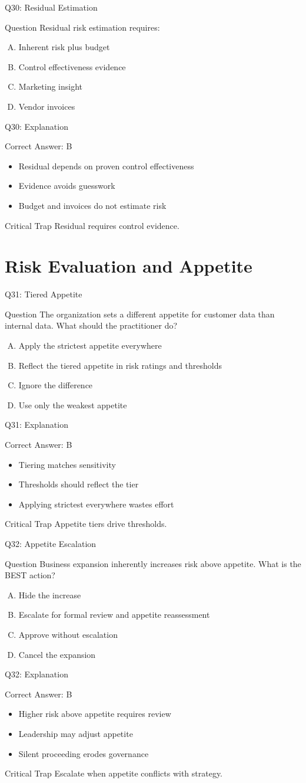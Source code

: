 \documentclass[aspectratio=169]{beamer}
\newcommand{\hq}[7]{%
	\begin{frame}{Q#1: #2}
		\begin{block}{Question}
			#3
		\end{block}
		\begin{enumerate}[(A)]
			#4
		\end{enumerate}
	\end{frame}
	\begin{frame}{Q#1: Explanation}
		\begin{block}{Correct Answer: #5}
			\begin{itemize}
				#6
			\end{itemize}
		\end{block}
		\begin{alertblock}{Critical Trap}
			#7
		\end{alertblock}
	\end{frame}
}
\begin{document}
	\hq{30}{Residual Estimation}
	{Residual risk estimation requires:}
	{\item Inherent risk plus budget
		\item Control effectiveness evidence
		\item Marketing insight
		\item Vendor invoices}
	{B}
	{\item Residual depends on proven control effectiveness
		\item Evidence avoids guesswork
		\item Budget and invoices do not estimate risk}
	{Residual requires control evidence.}
	
	\section{Risk Evaluation and Appetite}
	
	\hq{31}{Tiered Appetite}
	{The organization sets a different appetite for customer data than internal data. What should the practitioner do?}
	{\item Apply the strictest appetite everywhere
		\item Reflect the tiered appetite in risk ratings and thresholds
		\item Ignore the difference
		\item Use only the weakest appetite}
	{B}
	{\item Tiering matches sensitivity
		\item Thresholds should reflect the tier
		\item Applying strictest everywhere wastes effort}
	{Appetite tiers drive thresholds.}
	
	\hq{32}{Appetite Escalation}
	{Business expansion inherently increases risk above appetite. What is the BEST action?}
	{\item Hide the increase
		\item Escalate for formal review and appetite reassessment
		\item Approve without escalation
		\item Cancel the expansion}
	{B}
	{\item Higher risk above appetite requires review
		\item Leadership may adjust appetite
		\item Silent proceeding erodes governance}
	{Escalate when appetite conflicts with strategy.}
	
\end{document}
